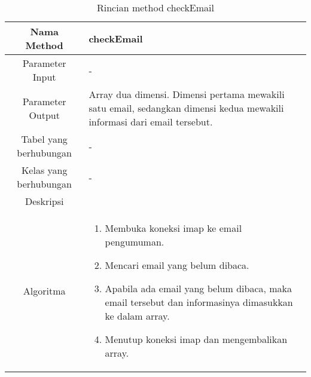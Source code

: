\begin{center}
	\begin{table}[H]
	\caption{Rincian method checkEmail}
	\label{table:pengumuman-model-checkemail}
\begin{tabular}{|c|p{11cm}|}
\hline
Nama Method 	& 	 	checkEmail\\
\hline
Parameter Input & - \\
\hline
Parameter Output & Array dua dimensi. Dimensi pertama mewakili satu email, sedangkan dimensi kedua mewakili informasi dari email tersebut.\\
\hline
Tabel yang berhubungan & - \\
\hline
Kelas yang berhubungan & - \\
\hline
Deskripsi	& \\
\hline
Algoritma	& \begin{enumerate}
				\item Membuka koneksi imap ke email pengumuman.
				\item Mencari email yang belum dibaca.
				\item Apabila ada email yang belum dibaca, maka email tersebut dan informasinya dimasukkan ke dalam array.
				\item Menutup koneksi imap dan mengembalikan array.
				\end{enumerate} \\
\hline
\end{tabular}
\end{table}
\end{center}

